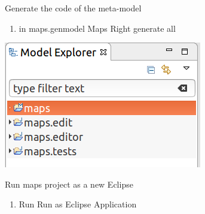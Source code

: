 \begin{frame}{Generate the code of the meta-model}


	\begin{enumerate}
		\item in maps.genmodel \ra Maps Right \ra generate all
	\end{enumerate}

\includegraphics[scale=0.3]{figs/workspace1.png}

\end{frame}

\begin{frame}{Run maps project as a new Eclipse}


	\begin{enumerate}
		\item Run \ra Run as \ra Eclipse Application		
	\end{enumerate}

\end{frame}

